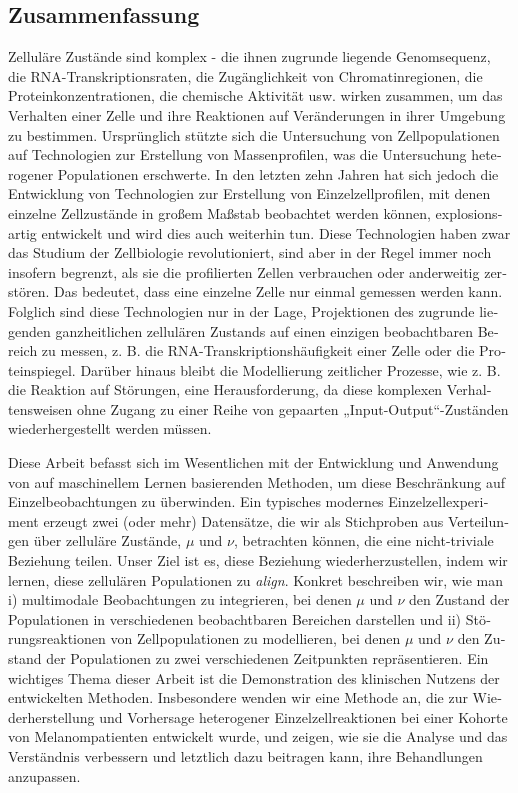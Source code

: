\newpage
\begin{otherlanguage}{ngerman}
\chapter*{Zusammenfassung}
Zelluläre Zustände sind komplex - die ihnen zugrunde liegende Genomsequenz, die RNA-Transkriptionsraten, die Zugänglichkeit von Chromatinregionen, die Proteinkonzentrationen, die chemische Aktivität usw. wirken zusammen, um das Verhalten einer Zelle und ihre Reaktionen auf Veränderungen in ihrer Umgebung zu bestimmen. Ursprünglich stützte sich die Untersuchung von Zellpopulationen auf Technologien zur Erstellung von Massenprofilen, was die Untersuchung heterogener Populationen erschwerte.
In den letzten zehn Jahren hat sich jedoch die Entwicklung von Technologien zur Erstellung von Einzelzellprofilen, mit denen einzelne Zellzustände in großem Maßstab beobachtet werden können, explosionsartig entwickelt und wird dies auch weiterhin tun.
Diese Technologien haben zwar das Studium der Zellbiologie revolutioniert, sind aber in der Regel immer noch insofern begrenzt, als sie die profilierten Zellen verbrauchen oder anderweitig zerstören.
Das bedeutet, dass eine einzelne Zelle nur einmal gemessen werden kann.
Folglich sind diese Technologien nur in der Lage, Projektionen des zugrunde liegenden ganzheitlichen zellulären Zustands auf einen einzigen beobachtbaren Bereich zu messen, z. B. die RNA-Transkriptionshäufigkeit einer Zelle oder die Proteinspiegel.
Darüber hinaus bleibt die Modellierung zeitlicher Prozesse, wie z. B. die Reaktion auf Störungen, eine Herausforderung, da diese komplexen Verhaltensweisen ohne Zugang zu einer Reihe von gepaarten „Input-Output“-Zuständen wiederhergestellt werden müssen.

Diese Arbeit befasst sich im Wesentlichen mit der Entwicklung und Anwendung von auf maschinellem Lernen basierenden Methoden, um diese Beschränkung auf Einzelbeobachtungen zu überwinden.
Ein typisches modernes Einzelzellexperiment erzeugt zwei (oder mehr) Datensätze, die wir als Stichproben aus Verteilungen über zelluläre Zustände, $\mu$ und $\nu$, betrachten können, die eine nicht-triviale Beziehung teilen.
Unser Ziel ist es, diese Beziehung wiederherzustellen, indem wir lernen, diese zellulären Populationen zu \emph{align}.
Konkret beschreiben wir, wie man
i) multimodale Beobachtungen zu integrieren, bei denen $\mu$ und $\nu$ den Zustand der Populationen in verschiedenen beobachtbaren Bereichen darstellen
und ii) Störungsreaktionen von Zellpopulationen zu modellieren, bei denen $\mu$ und $\nu$ den Zustand der Populationen zu zwei verschiedenen Zeitpunkten repräsentieren.
Ein wichtiges Thema dieser Arbeit ist die Demonstration des klinischen Nutzens der entwickelten Methoden.
Insbesondere wenden wir eine Methode an, die zur Wiederherstellung und Vorhersage heterogener Einzelzellreaktionen bei einer Kohorte von Melanompatienten entwickelt wurde, und zeigen, wie sie die Analyse und das Verständnis verbessern und letztlich dazu beitragen kann, ihre Behandlungen anzupassen.

\end{otherlanguage}


